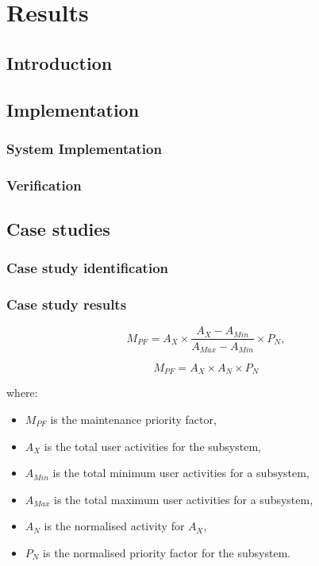 \chapter{Results}
\label{chap:3}

\section{Introduction}

\section{Implementation}

\subsection{System Implementation}

\subsection{Verification}

\section{Case studies}

\subsection{Case study identification}

\subsection{Case study results}

\begin{equation}
	M_{PF} = A_X \times \frac{A_X - A_{Min}}{A_{Max} - A_{Min}} \times P_{N},
\end{equation}

\begin{equation}
	M_{PF} = A_X \times A_{N} \times P_{N}
\end{equation}

where:

\begin{itemize}
	\item $M_{PF}$ is the maintenance priority factor,
	\item $A_X$ is the total user activities for the subsystem,
	\item $A_{Min}$ is the total minimum user activities for a subsystem,
	\item $A_{Max}$ is the total maximum user activities for a subsystem,
	\item $A_{N}$ is the normalised activity for $A_X$,
	\item $P_{N}$ is the normalised priority factor for the subsystem.
\end{itemize}

